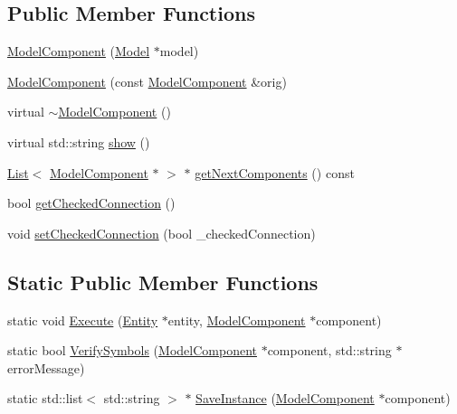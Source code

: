 \subsection*{Public Member Functions}
\begin{DoxyCompactItemize}
\item 
\hyperlink{class_model_component_a1e2b24c3592711a9bd3f131706b7f0c7}{Model\+Component} (\hyperlink{class_model}{Model} $\ast$model)
\item 
\hyperlink{class_model_component_a5b95933e7a265039eb01f6ec88d92675}{Model\+Component} (const \hyperlink{class_model_component}{Model\+Component} \&orig)
\item 
virtual \hyperlink{class_model_component_a6d490d6a2fdf66ad13ed8adcc39ec611}{$\sim$\+Model\+Component} ()
\item 
virtual std\+::string \hyperlink{class_model_component_ad8bc846e36b028eab7efb7da6c549eca}{show} ()
\item 
\hyperlink{class_list}{List}$<$ \hyperlink{class_model_component}{Model\+Component} $\ast$ $>$ $\ast$ \hyperlink{class_model_component_a89fe8e3fb064c68aebbecd36eeed7d43}{get\+Next\+Components} () const 
\item 
bool \hyperlink{class_model_component_a142b21a42547af06ceba81678eeccabc}{get\+Checked\+Connection} ()
\item 
void \hyperlink{class_model_component_af3ae0b0182c8d6291235e0eda0cb79b3}{set\+Checked\+Connection} (bool \+\_\+checked\+Connection)
\end{DoxyCompactItemize}
\subsection*{Static Public Member Functions}
\begin{DoxyCompactItemize}
\item 
static void \hyperlink{class_model_component_a08c5312c2f94f6621577cc1836c2d3e0}{Execute} (\hyperlink{class_entity}{Entity} $\ast$entity, \hyperlink{class_model_component}{Model\+Component} $\ast$component)
\item 
static bool \hyperlink{class_model_component_a0798a220cf903b34ce28c40e136d207d}{Verify\+Symbols} (\hyperlink{class_model_component}{Model\+Component} $\ast$component, std\+::string $\ast$error\+Message)
\item 
static std\+::list$<$ std\+::string $>$ $\ast$ \hyperlink{class_model_component_a45d3805f9b7051b7acc142e5d85cded6}{Save\+Instance} (\hyperlink{class_model_component}{Model\+Component} $\ast$component)
\end{DoxyCompactItemize}
